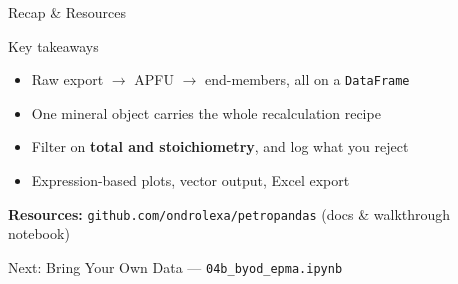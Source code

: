 \documentclass[aspectratio=169,11pt]{beamer}
\begin{document}
\begin{frame}{Recap \& Resources}
  \begin{block}{Key takeaways}
    \begin{itemize}
      \item Raw export $\rightarrow$ APFU $\rightarrow$ end-members, all on a \texttt{DataFrame}
      \item One mineral object carries the whole recalculation recipe
      \item Filter on \textbf{total and stoichiometry}, and log what you reject
      \item Expression-based plots, vector output, Excel export
    \end{itemize}
  \end{block}
  \vspace{0.3cm}
  \textbf{Resources:} \texttt{github.com/ondrolexa/petropandas} (docs \& walkthrough notebook)
  \vspace{0.4cm}

  \centering \Large Next: Bring Your Own Data --- \texttt{04b\_byod\_epma.ipynb}
\end{frame}
\end{document}
